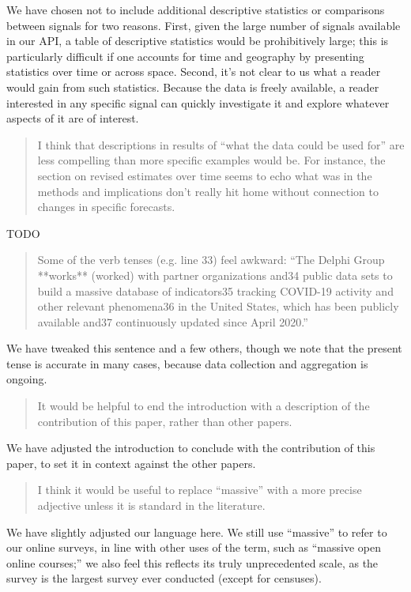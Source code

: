 \documentclass[11pt]{article}
\begin{document}
We have chosen not to include additional descriptive statistics or comparisons
between signals for two reasons. First, given the large number of signals
available in our API, a table of descriptive statistics would be prohibitively
large; this is particularly difficult if one accounts for time and geography by
presenting statistics over time or across space. Second, it's not clear to us
what a reader would gain from such statistics. Because the data is freely
available, a reader interested in any specific signal can quickly investigate it
and explore whatever aspects of it are of interest.

\begin{quote}
  I think that descriptions in results of ``what the data could be used for''
  are less compelling than more specific examples would be. For instance, the
  section on revised estimates over time seems to echo what was in the methods
  and implications don't really hit home without connection to changes in
  specific forecasts.
\end{quote}
TODO

\begin{quote}
  Some of the verb tenses (e.g. line 33) feel awkward: ``The Delphi Group
  **works** (worked) with partner organizations and34 public data sets to build
  a massive database of indicators35 tracking COVID-19 activity and other
  relevant phenomena36 in the United States, which has been publicly available
  and37 continuously updated since April 2020.''
\end{quote}
We have tweaked this sentence and a few others, though we note that the present
tense is accurate in many cases, because data collection and aggregation is
ongoing.

\begin{quote}
  It would be helpful to end the introduction with a description of the
  contribution of this paper, rather than other papers.
\end{quote}
We have adjusted the introduction to conclude with the contribution of this
paper, to set it in context against the other papers.

\begin{quote}
  I think it would be useful to replace ``massive'' with a more precise
  adjective unless it is standard in the literature.
\end{quote}
We have slightly adjusted our language here. We still use ``massive'' to refer
to our online surveys, in line with other uses of the term, such as ``massive
open online courses;'' we also feel this reflects its truly unprecedented scale,
as the survey is the largest survey ever conducted (except for censuses).
\end{document}
